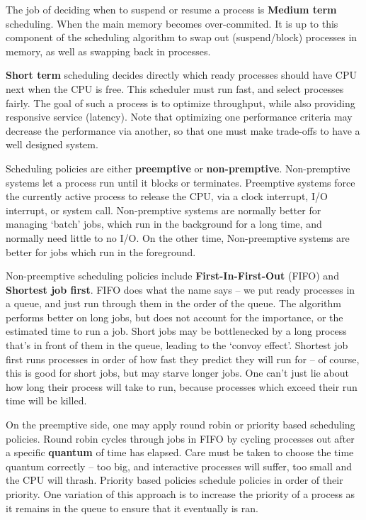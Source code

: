 The job of deciding when to suspend or resume a process is {\bf Medium term} scheduling. When the main memory becomes over-commited. It is up to this component of the scheduling algorithm to swap out (suspend/block) processes in memory, as well as swapping back in processes.

{\bf Short term} scheduling decides directly which ready processes should have CPU next when the CPU is free. This scheduler must run fast, and select processes fairly. The goal of such a process is to optimize throughput, while also providing responsive service (latency). Note that optimizing one performance criteria may decrease the performance via another, so that one must make trade-offs to have a well designed system.

Scheduling policies are either {\bf preemptive} or {\bf non-premptive}. Non-premptive systems let a process run until it blocks or terminates. Preemptive systems force the currently active process to release the CPU, via a clock interrupt, I/O interrupt, or system call. Non-premptive systems are normally better for managing `batch' jobs, which run in the background for a long time, and normally need little to no I/O. On the other time, Non-preemptive systems are better for jobs which run in the foreground.

Non-preemptive scheduling policies include {\bf First-In-First-Out} (FIFO) and {\bf Shortest job first}. FIFO does what the name says -- we put ready processes in a queue, and just run through them in the order of the queue. The algorithm performs better on long jobs, but does not account for the importance, or the estimated time to run a job. Short jobs may be bottlenecked by a long process that's in front of them in the queue, leading to the `convoy effect'. Shortest job first runs processes in order of how fast they predict they will run for -- of course, this is good for short jobs, but may starve longer jobs. One can't just lie about how long their process will take to run, because processes which exceed their run time will be killed.

On the preemptive side, one may apply round robin or priority based scheduling policies. Round robin cycles through jobs in FIFO by cycling processes out after a specific {\bf quantum} of time has elapsed. Care must be taken to choose the time quantum correctly -- too big, and interactive processes will suffer, too small and the CPU will thrash. Priority based policies schedule policies in order of their priority. One variation of this approach is to increase the priority of a process as it remains in the queue to ensure that it eventually is ran.

